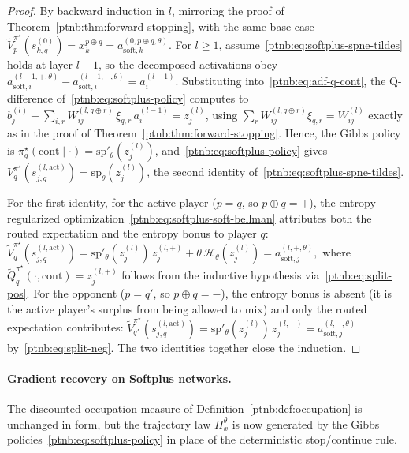 \begin{proof}
By backward induction in $l$, mirroring the proof of Theorem~\ref{ptnb:thm:forward-stopping}, with the
same base case $\tilde V_p^{\pi^\star}(s_{k,q}^{(0)}) = x_k^{p\oplus q} = a_{\mathrm{soft},k}^{(0,
    p\oplus q, \theta)}$. For $l \ge 1$, assume~\eqref{ptnb:eq:softplus-spne-tildes} holds at layer $l-1$,
so the decomposed activations obey $a_{\mathrm{soft},i}^{(l-1, +,\theta)} -
    a_{\mathrm{soft},i}^{(l-1, -,\theta)} = a_i^{(l-1)}$. Substituting into~\eqref{ptnb:eq:adf-q-cont}, the
Q-difference of~\eqref{ptnb:eq:softplus-policy} computes to
$b_j^{(l)} + \sum_{i,r} W_{ij}^{(l, q\oplus r)}\, \xi_{q,r}\, a_i^{(l-1)} = z_j^{(l)}$, using
$\sum_r W_{ij}^{(l, q\oplus r)}\xi_{q,r} = W_{ij}^{(l)}$ exactly as in the proof of
Theorem~\ref{ptnb:thm:forward-stopping}. Hence, the Gibbs policy is $\pi_q^\star(\mathrm{cont}\mid
    \cdot) = \mathrm{sp}'_\theta(z_j^{(l)})$, and~\eqref{ptnb:eq:softplus-policy} gives
$V_q^{\pi^\star}(s_{j,q}^{(l, \mathrm{act})}) = \mathrm{sp}_\theta(z_j^{(l)})$, the second identity
of~\eqref{ptnb:eq:softplus-spne-tildes}.

For the first identity, for the active player ($p = q$, so $p \oplus q = +$), the
entropy-regularized optimization~\eqref{ptnb:eq:softplus-soft-bellman} attributes both the routed
expectation and the entropy bonus to player $q$:
\(
    \tilde V_q^{\pi^\star}(s_{j,q}^{(l, \mathrm{act})})
    = \mathrm{sp}'_\theta(z_j^{(l)})\, z_j^{(l, +)} + \theta\, \mathcal{H}_\theta(z_j^{(l)})
    = a_{\mathrm{soft},j}^{(l, +, \theta)},
\)
where $\tilde Q_q^{\pi^\star}(\cdot, \mathrm{cont}) = z_j^{(l, +)}$ follows from the inductive
hypothesis via~\eqref{ptnb:eq:split-pos}. For the opponent ($p = q'$, so $p \oplus q = -$), the entropy
bonus is absent (it is the active player's surplus from being allowed to mix) and only the routed
expectation contributes:
\(
    \tilde V_{q'}^{\pi^\star}(s_{j,q}^{(l, \mathrm{act})})
    = \mathrm{sp}'_\theta(z_j^{(l)})\, z_j^{(l, -)}
    = a_{\mathrm{soft},j}^{(l, -, \theta)}
\)
by~\eqref{ptnb:eq:split-neg}. The two identities together close the induction.
\end{proof}

\paragraph{Gradient recovery on Softplus networks.}\label{ptnb:app:softplus-gradient}
The discounted occupation measure of Definition~\ref{ptnb:def:occupation} is unchanged in form, but the
trajectory law $\Pi_x^\theta$ is now generated by the Gibbs policies~\eqref{ptnb:eq:softplus-policy} in
place of the deterministic stop/continue rule.

